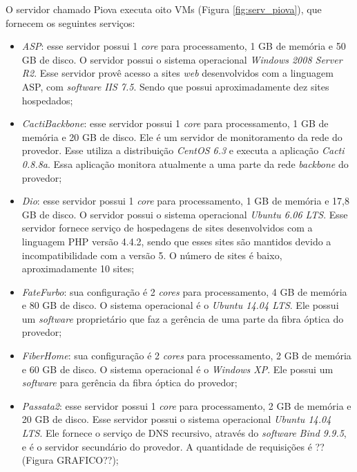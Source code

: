 O servidor chamado Piova executa oito \ac{VM}s (Figura \ref{fig:serv_piova}), que fornecem os seguintes serviços:
\begin{itemize}
 \item \textit{ASP}: esse servidor possui 1 \textit{core} para processamento, 1 GB de memória e 50 GB de disco. O servidor possui o sistema 
 operacional \textit{Windows 2008 Server R2}. Esse servidor provê acesso a sites \textit{web} desenvolvidos com a linguagem \ac{ASP}, com
 \textit{software} \textit{\ac{IIS} 7.5}. Sendo que possui aproximadamente dez sites hospedados;
 
 \item \textit{CactiBackbone}: esse servidor possui 1 \textit{core} para processamento, 1 GB de memória e 20 GB de disco. Ele é um servidor
 de monitoramento da rede do provedor. Esse utiliza a distribuição \textit{CentOS 6.3} e executa a aplicação \textit{Cacti 0.8.8a}. 
 Essa aplicação monitora atualmente a uma parte da rede \textit{backbone} do provedor;
 
 \item \textit{Dio}: esse servidor possui 1 \textit{core} para processamento, 1 GB de memória e 17,8 GB de disco. O servidor possui o sistema 
 operacional \textit{Ubuntu 6.06 \ac{LTS}}. Esse servidor fornece serviço de hospedagens de sites desenvolvidos com a linguagem \ac{PHP} 
 versão 4.4.2, sendo que esses sites são mantidos devido a incompatibilidade com a versão 5. O número de sites é baixo, aproximadamente 10 sites;
 
 \item \textit{FateFurbo}: sua configuração é 2 \textit{cores} para processamento, 4 GB de memória e 80 GB de disco. O sistema operacional é o 
 \textit{Ubuntu 14.04 \ac{LTS}}. Ele possui um \textit{software} proprietário que faz a gerência de uma parte da fibra óptica do provedor;
 
 \item \textit{FiberHome}: sua configuração é 2 \textit{cores} para processamento, 2 GB de memória e 60 GB de disco. O sistema operacional é o 
 \textit{Windows XP}. Ele possui um \textit{software} para gerência da fibra óptica do provedor;
 
 \item \textit{Passata2}: esse servidor possui 1 \textit{core} para processamento, 2 GB de memória e 20 GB de disco. Esse servidor possui o 
 sistema operacional \textit{Ubuntu 14.04 \ac{LTS}}. Ele fornece o serviço de \ac{DNS} recursivo, através do \textit{software} 
 \textit{Bind 9.9.5}, e é o servidor secundário do provedor. A quantidade de requisições é ?? (Figura GRAFICO??);
 

\end{itemize}
